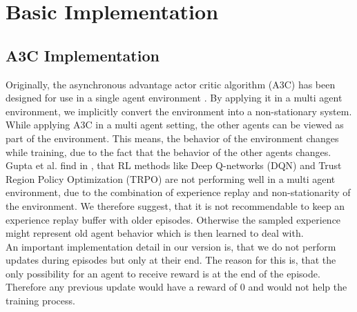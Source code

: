 

%
%

\chapter{Basic Implementation}\label{chap.basic_implementation}
\section{A3C Implementation}\label{a3c_implementation}
Originally, the asynchronous advantage actor critic algorithm (A3C) has been designed for use in a single agent environment \cite{a3c}.
By applying it in a multi agent environment, we implicitly convert the environment into a non-stationary system.
While applying A3C in a multi agent setting, the other agents can be viewed as part of the environment. This means, the behavior of the environment changes while training, due to the fact that the behavior of the other agents changes.
Gupta et al. find in \cite{multiagent_comp_a3c_dqn_etc}, that RL methods like Deep Q-networks (DQN) and Trust Region Policy Optimization (TRPO) are not performing well in a multi agent environment, due to the combination of experience replay and non-stationarity of the environment. We therefore suggest, that it is not recommendable to keep an experience replay buffer with older episodes. Otherwise the sampled experience might represent old agent behavior which is then learned to deal with.\\
An important implementation detail in our version is, that we do not perform updates during episodes but only at their end. The reason for this is, that the only possibility for an agent to receive reward is at the end of the episode. Therefore any previous update would have a reward of 0 and would not help the training process.

